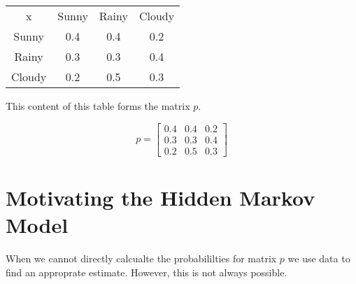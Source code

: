 \begin{center}
	\begin{tabular}{c c c c}
		x      & Sunny & Rainy & Cloudy \\
		Sunny  & 0.4   & 0.4   & 0.2 \\
		Rainy  & 0.3   & 0.3   & 0.4 \\ 
		Cloudy & 0.2   & 0.5   & 0.3 
	\end{tabular}
\end{center}

This content of this table forms the matrix $p$. 

\begin{equation}
p = 
\begin{bmatrix}
	0.4 & 0.4 & 0.2 \\
	0.3 & 0.3 & 0.4 \\
	0.2 & 0.5 & 0.3 
	\end{bmatrix}
\end{equation}


\section{Motivating the Hidden Markov Model}
 When we cannot directly calcualte the probabililties for matrix $p$ we use data to find an approprate estimate. However, this is not always possible.

